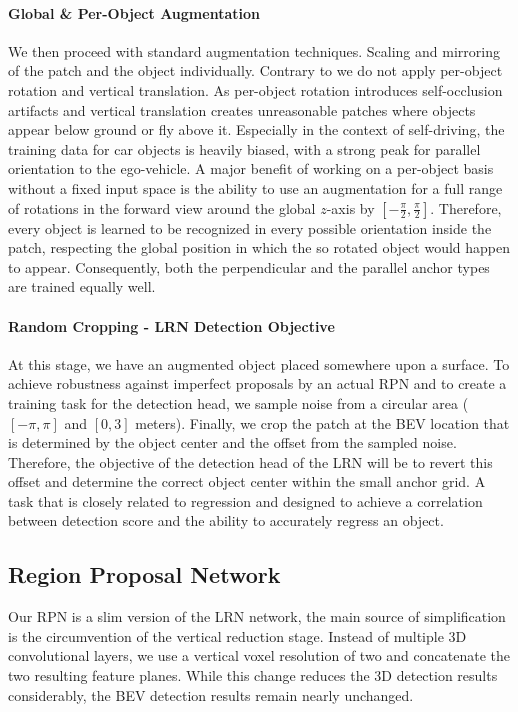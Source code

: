 \documentclass{article}
\begin{document}
\paragraph{Global \& Per-Object Augmentation}
We then proceed with standard augmentation techniques. Scaling and mirroring of the patch and the object individually.
Contrary to \cite{Zhou2018voxel,Yan2018second} we do not apply per-object rotation and vertical translation. As per-object rotation introduces self-occlusion artifacts and vertical translation creates unreasonable patches where objects appear below ground or fly above it. 
Especially in the context of self-driving, the training data for car objects is heavily biased, with a strong peak for parallel orientation to the ego-vehicle. A major benefit of working on a per-object basis without a fixed input space is the ability to use an augmentation for a full range of rotations in the forward view around the global $z$-axis by $[-\frac{\pi}{2},\frac{\pi}{2}]$. 
Therefore, every object is learned to be recognized in every possible orientation inside the patch, respecting the global position in which the so rotated object would happen to appear. Consequently, both the perpendicular and the parallel anchor types are trained equally well.

\paragraph{Random Cropping - LRN Detection Objective}
At this stage, we have an augmented object placed somewhere upon a surface. To achieve robustness against imperfect proposals by an actual RPN and to create a training task for the detection head, we sample noise from a circular area ($[-\pi,\pi]$ and $[0, 3]$ meters). Finally, we crop the patch at the BEV location that is determined by the object center and the offset from the sampled noise. Therefore, the objective of the detection head of the LRN will be to revert this offset and determine the correct object center within the small anchor grid. A task that is closely related to regression and designed to achieve a correlation between detection score and the ability to accurately regress an object.

\subsection{Region Proposal Network}
Our RPN is a slim version of the LRN network, the main source of simplification is the circumvention of the vertical reduction stage. Instead of multiple 3D convolutional layers, we use a vertical voxel resolution of two and concatenate the two resulting feature planes.
While this change reduces the 3D detection results considerably, the BEV detection results remain nearly unchanged. 
\end{document}
